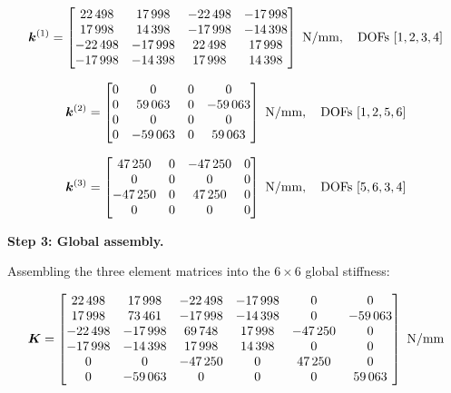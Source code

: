 \begin{example}
\begin{equation*}
\bm{k}^{(1)} = \begin{bmatrix}
 22\,498 &  17\,998 & -22\,498 & -17\,998 \\
 17\,998 &  14\,398 & -17\,998 & -14\,398 \\
-22\,498 & -17\,998 &  22\,498 &  17\,998 \\
-17\,998 & -14\,398 &  17\,998 &  14\,398
\end{bmatrix}\ \text{N/mm}, \quad \text{DOFs } [1,2,3,4]
\end{equation*}

\begin{equation*}
\bm{k}^{(2)} = \begin{bmatrix}
0 & 0 &      0 &      0 \\
0 & 59\,063 &  0 & -59\,063 \\
0 & 0 &      0 &      0 \\
0 & -59\,063 & 0 &  59\,063
\end{bmatrix}\ \text{N/mm}, \quad \text{DOFs } [1,2,5,6]
\end{equation*}

\begin{equation*}
\bm{k}^{(3)} = \begin{bmatrix}
 47\,250 & 0 & -47\,250 & 0 \\
      0 & 0 &       0 & 0 \\
-47\,250 & 0 &  47\,250 & 0 \\
      0 & 0 &       0 & 0
\end{bmatrix}\ \text{N/mm}, \quad \text{DOFs } [5,6,3,4]
\end{equation*}

\medskip
\noindent\textbf{Step 3: Global assembly.}

Assembling the three element matrices into the $6\times6$ global stiffness:

\begin{equation*}
\bm{K} = \begin{bmatrix}
 22\,498 &  17\,998 & -22\,498 & -17\,998 &       0 &       0 \\
 17\,998 &  73\,461 & -17\,998 & -14\,398 &       0 & -59\,063 \\
-22\,498 & -17\,998 &  69\,748 &  17\,998 & -47\,250 &       0 \\
-17\,998 & -14\,398 &  17\,998 &  14\,398 &       0 &       0 \\
       0 &       0 & -47\,250 &       0 &  47\,250 &       0 \\
       0 & -59\,063 &       0 &       0 &       0 &  59\,063
\end{bmatrix}\ \text{N/mm}
\end{equation*}


\end{example}
